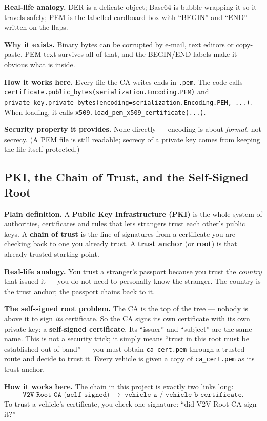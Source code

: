 \documentclass[11pt,a4paper]{article}
\begin{document}
\textbf{Real-life analogy.} DER is a delicate object; Base64 is bubble-wrapping
it so it travels safely; PEM is the labelled cardboard box with ``BEGIN'' and
``END'' written on the flaps.

\textbf{Why it exists.} Binary bytes can be corrupted by e-mail, text editors or
copy-paste. PEM text survives all of that, and the BEGIN/END labels make it
obvious what is inside.

\textbf{How it works here.} Every file the CA writes ends in \texttt{.pem}. The
code calls \texttt{certificate.public\_bytes(serialization.Encoding.PEM)} and
\texttt{private\_key.private\_bytes(encoding=serialization.Encoding.PEM, ...)}.
When loading, it calls \texttt{x509.load\_pem\_x509\_certificate(...)}.

\textbf{Security property it provides.} None directly --- encoding is about
\emph{format}, not secrecy. (A PEM file is still readable; secrecy of a private
key comes from keeping the file itself protected.)

\subsection{PKI, the Chain of Trust, and the Self-Signed Root}
\textbf{Plain definition.} A \textbf{Public Key Infrastructure (PKI)} is the
whole system of authorities, certificates and rules that lets strangers trust
each other's public keys. A \textbf{chain of trust} is the line of signatures
from a certificate you are checking back to one you already trust. A
\textbf{trust anchor} (or \textbf{root}) is that already-trusted starting point.

\textbf{Real-life analogy.} You trust a stranger's passport because you trust the
\emph{country} that issued it --- you do not need to personally know the
stranger. The country is the trust anchor; the passport chains back to it.

\textbf{The self-signed root problem.} The CA is the top of the tree --- nobody
is above it to sign \emph{its} certificate. So the CA signs its own certificate
with its own private key: a \textbf{self-signed certificate}. Its ``issuer'' and
``subject'' are the same name. This is not a security trick; it simply means
``trust in this root must be established out-of-band'' --- you must obtain
\texttt{ca\_cert.pem} through a trusted route and decide to trust it. Every
vehicle is given a copy of \texttt{ca\_cert.pem} as its trust anchor.

\textbf{How it works here.} The chain in this project is exactly two links long:
\[
\texttt{V2V-Root-CA (self-signed)} \;\longrightarrow\;
\texttt{vehicle-a / vehicle-b certificate}.
\]
To trust a vehicle's certificate, you check one signature: ``did V2V-Root-CA
sign it?''
\end{document}
